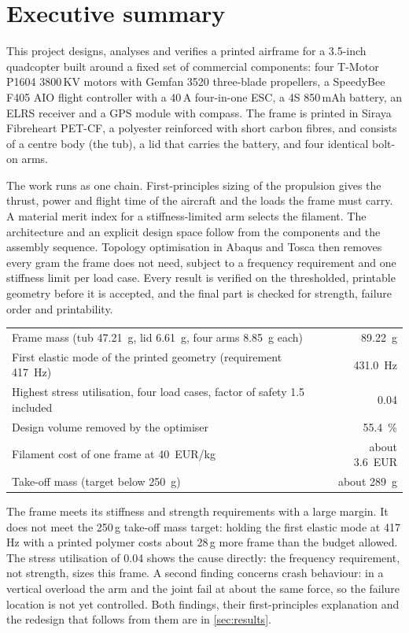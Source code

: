 \section{Executive summary}\label{sec:summary}

This project designs, analyses and verifies a printed airframe for a 3.5-inch quadcopter built around a fixed set of commercial components: four T-Motor P1604 3800\,KV motors with Gemfan 3520 three-blade propellers, a SpeedyBee F405 AIO flight controller with a 40\,A four-in-one ESC, a 4S 850\,mAh battery, an ELRS receiver and a GPS module with compass. The frame is printed in Siraya Fibreheart PET-CF, a polyester reinforced with short carbon fibres, and consists of a centre body (the tub), a lid that carries the battery, and four identical bolt-on arms.

The work runs as one chain. First-principles sizing of the propulsion gives the thrust, power and flight time of the aircraft and the loads the frame must carry. A material merit index for a stiffness-limited arm selects the filament. The architecture and an explicit design space follow from the components and the assembly sequence. Topology optimisation in Abaqus and Tosca then removes every gram the frame does not need, subject to a frequency requirement and one stiffness limit per load case. Every result is verified on the thresholded, printable geometry before it is accepted, and the final part is checked for strength, failure order and printability.

\begin{keybox}
\small
\begin{tabularx}{\linewidth}{@{}Xr@{}}
Frame mass (tub \SI{47.21}{\gram}, lid \SI{6.61}{\gram}, four arms \SI{8.85}{\gram} each) & \SI{89.22}{\gram}\\
First elastic mode of the printed geometry (requirement \SI{417}{\hertz}) & \SI{431.0}{\hertz}\\
Highest stress utilisation, four load cases, factor of safety 1.5 included & 0.04\\
Design volume removed by the optimiser & \SI{55.4}{\percent}\\
Filament cost of one frame at \SI{40}{EUR/kg} & about \SI{3.6}{EUR}\\
Take-off mass (target below \SI{250}{\gram}) & about \SI{289}{\gram}\\
\end{tabularx}
\end{keybox}

The frame meets its stiffness and strength requirements with a large margin. It does not meet the 250\,g take-off mass target: holding the first elastic mode at 417\,Hz with a printed polymer costs about 28\,g more frame than the budget allowed. The stress utilisation of 0.04 shows the cause directly: the frequency requirement, not strength, sizes this frame. A second finding concerns crash behaviour: in a vertical overload the arm and the joint fail at about the same force, so the failure location is not yet controlled. Both findings, their first-principles explanation and the redesign that follows from them are in \cref{sec:results}.

